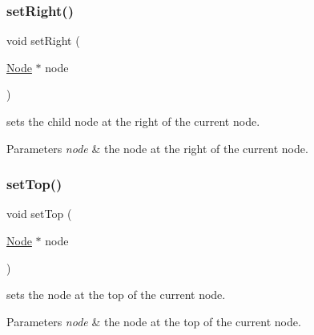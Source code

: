 \subsubsection{\texorpdfstring{set\+Right()}{setRight()}}
{\footnotesize\ttfamily void set\+Right (\begin{DoxyParamCaption}\item[{\mbox{\hyperlink{class_open_chams_1_1_node}{Node}} $\ast$}]{node }\end{DoxyParamCaption})\hspace{0.3cm}{\ttfamily [inline]}}



sets the child node at the right of the current node. 


\begin{DoxyParams}{Parameters}
{\em node} & the node at the right of the current node. \\
\hline
\end{DoxyParams}
\mbox{\label{class_open_chams_1_1_node_a32e2fbbb73c6b7ee4a30189cc30106bf}} 
\subsubsection{\texorpdfstring{set\+Top()}{setTop()}}
{\footnotesize\ttfamily void set\+Top (\begin{DoxyParamCaption}\item[{\mbox{\hyperlink{class_open_chams_1_1_node}{Node}} $\ast$}]{node }\end{DoxyParamCaption})\hspace{0.3cm}{\ttfamily [inline]}}



sets the node at the top of the current node. 


\begin{DoxyParams}{Parameters}
{\em node} & the node at the top of the current node. \\
\hline
\end{DoxyParams}
